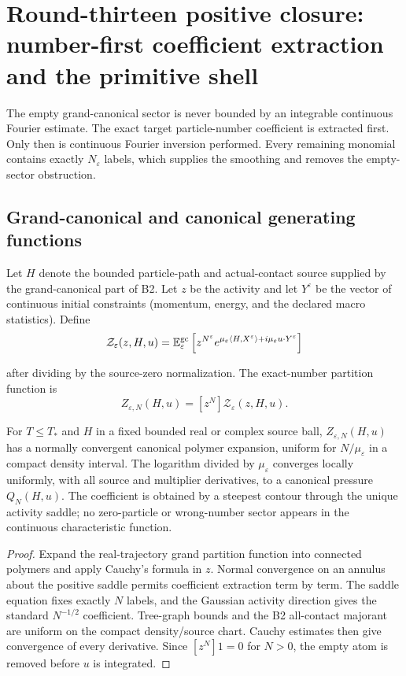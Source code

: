 \section{Round-thirteen positive closure: number-first coefficient extraction and the primitive shell}
\label{sec:r13-b1}

The empty grand-canonical sector is never bounded by an integrable continuous
Fourier estimate.  The exact target particle-number coefficient is extracted
first.  Only then is continuous Fourier inversion performed.  Every remaining
monomial contains exactly $N_\varepsilon$ labels, which supplies the smoothing
and removes the empty-sector obstruction.

\subsection{Grand-canonical and canonical generating functions}

Let $H$ denote the bounded particle-path and actual-contact source supplied by
the grand-canonical part of B2.  Let $z$ be the activity and let
$Y^\varepsilon$ be the vector of continuous initial constraints (momentum,
energy, and the declared macro statistics).  Define
\[
 \mathcal Z_\varepsilon(z,H,u)
 =\mathbb E_\varepsilon^{\rm gc}
 \left[z^{N^\varepsilon}
 e^{\mu_\varepsilon\langle H,X^\varepsilon\rangle
   +i\mu_\varepsilon u\cdot Y^\varepsilon}
 \right]
\]

after dividing by the source-zero normalization.  The exact-number
partition function is
\[
 Z_{\varepsilon,N}(H,u)=[z^N]\mathcal Z_\varepsilon(z,H,u).
\]

\begin{theorem}
\label{thm:r13-b1-coefficient-expansion}
For $T\le T_*$ and $H$ in a fixed bounded real or complex source ball,
$Z_{\varepsilon,N}(H,u)$ has a normally convergent canonical polymer
expansion, uniform for
$N/\mu_\varepsilon$ in a compact density interval.  The logarithm divided by
$\mu_\varepsilon$ converges locally uniformly, with all source and multiplier
derivatives, to a canonical pressure $Q_N(H,u)$.  The coefficient is obtained
by a steepest contour through the unique activity saddle; no zero-particle or
wrong-number sector appears in the continuous characteristic function.
\end{theorem}

\begin{proof}
Expand the real-trajectory grand partition function into connected polymers
and apply Cauchy's formula in $z$.  Normal convergence on an annulus about the
positive saddle permits coefficient extraction term by term.  The saddle
equation fixes exactly $N$ labels, and the Gaussian activity direction gives
the standard $N^{-1/2}$ coefficient.  Tree-graph bounds and the B2 all-contact
majorant are uniform on the compact density/source chart.  Cauchy estimates
then give convergence of every derivative.  Since $[z^N]1=0$ for $N>0$, the
empty atom is removed before $u$ is integrated.
\end{proof}

